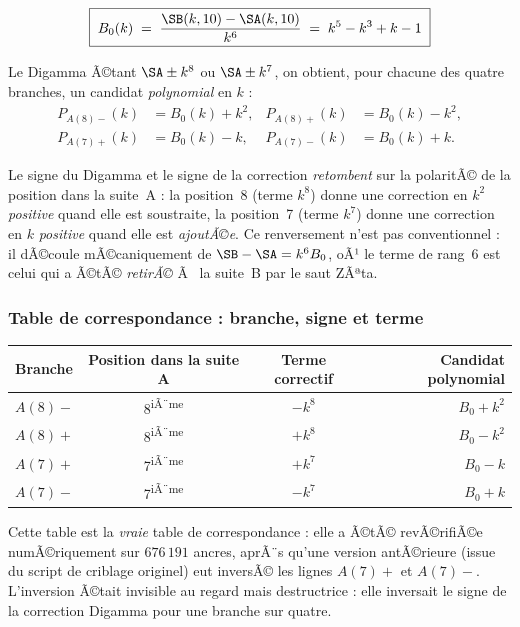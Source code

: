 \begin{boiteformule}
\[
  \boxed{\;B_0(k) \;=\; \frac{\SB(k,10)-\SA(k,10)}{k^{6}}
  \;=\; k^{5}-k^{3}+k-1\;}
\]
\end{boiteformule}

Le Digamma Ã©tant $\SA \pm k^{8}$ ou $\SA \pm k^{7}$, on obtient, pour
chacune des quatre branches, un candidat \emph{polynomial} en $k$ :
\begin{align*}
  P_{A(8)-}(k) &= B_0(k) + k^{2}, &
  P_{A(8)+}(k) &= B_0(k) - k^{2},\\
  P_{A(7)+}(k) &= B_0(k) - k, &
  P_{A(7)-}(k) &= B_0(k) + k.
\end{align*}

\begin{boitenote}
Le signe du Digamma et le signe de la correction \emph{retombent} sur la
polaritÃ© de la position dans la suite~A : la position~8 (terme
$k^{8}$) donne une correction en $k^{2}$ \emph{positive} quand elle est
soustraite, la position~7 (terme $k^{7}$) donne une correction en $k$
\emph{positive} quand elle est \emph{ajoutÃ©e}. Ce renversement n'est pas
conventionnel : il dÃ©coule mÃ©caniquement de
$\SB-\SA = k^{6}B_0$, oÃ¹ le terme de rang~6 est celui qui a Ã©tÃ©
\emph{retirÃ©} Ã  la suite~B par le saut ZÃªta.
\end{boitenote}

\subsubsection{Table de correspondance : branche, signe et terme}

\begin{center}
\small
\begin{tabular}{@{}l c c r@{}}
\toprule
\rowcolor{spectralgris}
Branche & Position dans la suite A & Terme correctif & Candidat polynomial \\
\midrule
$A(8)-$ & 8\textsuperscript{iÃ¨me} & $-k^{8}$ & $B_0+k^{2}$ \\
$A(8)+$ & 8\textsuperscript{iÃ¨me} & $+k^{8}$ & $B_0-k^{2}$ \\
$A(7)+$ & 7\textsuperscript{iÃ¨me} & $+k^{7}$ & $B_0-k$ \\
$A(7)-$ & 7\textsuperscript{iÃ¨me} & $-k^{7}$ & $B_0+k$ \\
\bottomrule
\end{tabular}
\end{center}

Cette table est la \emph{vraie} table de correspondance : elle a Ã©tÃ©
revÃ©rifiÃ©e numÃ©riquement sur $676\,191$ ancres, aprÃ¨s qu'une version
antÃ©rieure (issue du script de criblage originel) eut inversÃ© les
lignes $A(7)+$ et $A(7)-$. L'inversion Ã©tait invisible au regard mais
destructrice : elle inversait le signe de la correction Digamma pour
une branche sur quatre.

